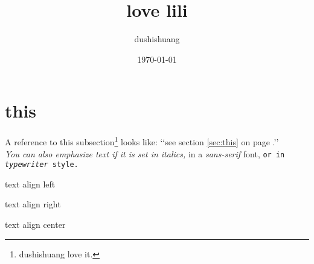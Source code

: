 \documentclass{book}
\title{love lili}
\author{dushishuang}
\date{\today}
\begin{document}
\frontmatter
\maketitle
\newpage
\section{this}
A reference to this subsection\footnote{dushishuang love it.}
\label{sec:this} looks like:
‘‘see section \ref{sec:this} on
page \pageref{sec:this}.’’\\
\textit{You can also
\emph{emphasize} text if
it is set in italics,}
\textsf{in a
\emph{sans-serif} font,}
\texttt{or in
\emph{typewriter} style.}\\

\begin{flushleft}
\textsf{
text align left}
\end{flushleft}
\begin{flushright}
text align right
\end{flushright}
\begin{center}
text align center
\end{center}
\end{document}
